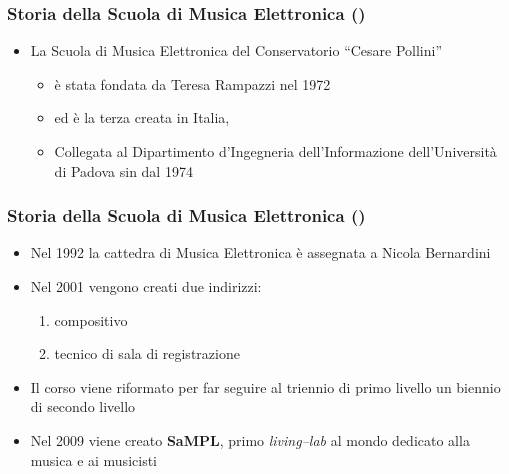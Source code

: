 %
%
%

\setcounter{ms}{0}
\begin{frame}
    \frametitle<+->{Storia della Scuola di Musica Elettronica ()}

	\begin{itemize}[<+- | alert@+->]

		\item La Scuola di Musica Elettronica del Conservatorio ``Cesare Pollini''

      \begin{itemize}[<+- | alert@+->]

        \item \`e stata fondata da Teresa Rampazzi nel 1972

        \item ed \`e la terza creata in Italia, 

        \item Collegata al Dipartimento d'Ingegneria dell'Informazione
        dell'Universit\`a di Padova sin dal 1974

     \end{itemize}

	\end{itemize}

\end{frame}

\begin{frame}
    \frametitle<+->{Storia della Scuola di Musica Elettronica ()}

	\begin{itemize}[<+- | alert@+->]

		\item Nel 1992 la cattedra di Musica Elettronica \`e assegnata a Nicola Bernardini

    \item Nel 2001 vengono creati due indirizzi:

      \begin{enumerate}[<+- | alert@+->]

        \item compositivo

        \item tecnico di sala di registrazione

      \end{enumerate}

    \item Il corso viene riformato per far seguire al triennio di primo livello
    un biennio di secondo livello

    \item Nel 2009 viene creato \textbf{SaMPL}, primo \emph{living--lab} al mondo
    dedicato alla musica e ai musicisti

	\end{itemize}

\end{frame}
